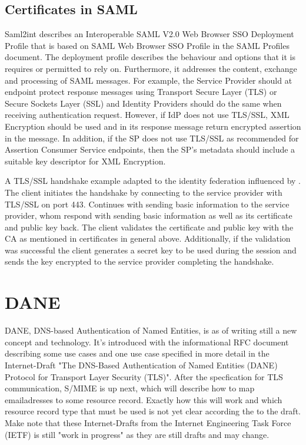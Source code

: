 \subsection{Certificates in SAML}

Saml2int\cite{website:saml2int} describes an Interoperable SAML V2.0 Web Browser SSO Deployment Profile that is based on 
SAML Web Browser SSO Profile in the SAML Profiles document\cite{pdf:oasis-open-profiles}. 
The deployment profile describes the behaviour and options that it is requires or permitted to rely on. 
Furthermore, it addresses the content, exchange and processing of SAML messages.
For example\cite{website:saml2int}, the Service Provider should at endpoint protect response 
messages using Transport Secure Layer (TLS) or Secure Sockets Layer (SSL)  and Identity Providers should do the same when receiving 
authentication request. 
However, if IdP does not use TLS/SSL, XML Encryption should be used and in its response 
message return encrypted assertion in the message. 
In addition, if the SP does not use TLS/SSL as recommended for Assertion Consumer Service
endpoints, then the SP's metadata should include a suitable key descriptor for XML Encryption.

A TLS/SSL handshake example adapted to the identity federation influenced by \cite{website:ssl_explained}.
The client initiates the handshake by connecting to the service provider with TLS/SSL on port 443. 
Continues with sending basic information to the service provider, whom respond with sending basic 
information as well as its certificate and public key back. 
The client validates the certificate and public key with the CA as mentioned in certificates in general above. 
Additionally, if the validation was successful the client generates a secret key to be used during the session and 
sends the key encrypted to the service provider completing the handshake. 

\section{DANE} 
DANE, DNS-based Authentication of Named Entities, is as of writing still a new concept and technology.
It's introduced with the informational RFC document\cite{rfc:6394} describing some use cases and one use case specified in more detail in the Internet-Draft "The DNS-Based Authentication of Named Entities (DANE) Protocol for Transport Layer Security (TLS)"\cite{rfc:draft-dane}.
After the specfication for TLS communication, S/MIME is up next, which will describe how to map emailadresses to some resource record.
Exactly how this will work and which resource record type that must be used is not yet clear according the to the draft\cite{rfc:draft-smime}.
Make note that these Internet-Drafts from the Internet Engineering Task Force (IETF) is still "work in progress" as they are still drafts and may change.

